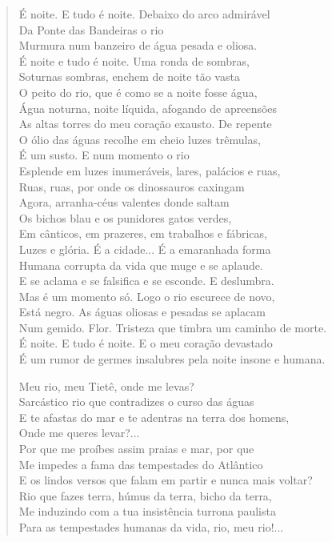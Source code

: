 \begin{verse}
É noite. E tudo é noite. Debaixo do arco admirável\\
Da Ponte das Bandeiras o rio\\
Murmura num banzeiro de água pesada e oliosa.\\
É noite e tudo é noite. Uma ronda de sombras,\\
Soturnas sombras, enchem de noite tão vasta\\
O peito do rio, que é como se a noite fosse água,\\
Água noturna, noite líquida, afogando de apreensões\\
As altas torres do meu coração exausto. De repente\\
O ólio das águas recolhe em cheio luzes trêmulas,\\
É um susto. E num momento o rio\\
Esplende em luzes inumeráveis, lares, palácios e ruas,\\
Ruas, ruas, por onde os dinossauros caxingam\\
Agora, arranha-céus valentes donde saltam\\
Os bichos blau e os punidores gatos verdes,\\
Em cânticos, em prazeres, em trabalhos e fábricas,\\
Luzes e glória. É a cidade... É a emaranhada forma\\
Humana corrupta da vida que muge e se aplaude.\\
E se aclama e se falsifica e se esconde. E deslumbra.\\
Mas é um momento só. Logo o rio escurece de novo,\\
Está negro. As águas oliosas e pesadas se aplacam\\
Num gemido. Flor. Tristeza que timbra um caminho de morte.\\
É noite. E tudo é noite. E o meu coração devastado\\
É um rumor de germes insalubres pela noite insone e humana.

Meu rio, meu Tietê, onde me levas?\\
Sarcástico rio que contradizes o curso das águas\\
E te afastas do mar e te adentras na terra dos homens,\\
Onde me queres levar?...\\
Por que me proíbes assim praias e mar, por que\\
Me impedes a fama das tempestades do Atlântico\\
E os lindos versos que falam em partir e nunca mais voltar?\\
Rio que fazes terra, húmus da terra, bicho da terra,\\
Me induzindo com a tua insistência turrona paulista\\
Para as tempestades humanas da vida, rio, meu rio!...


\end{verse}
